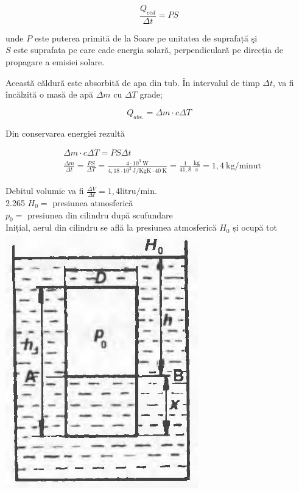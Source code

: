 \documentclass[10pt]{article}
\begin{document}
$$
\frac{Q_{c e d}}{\Delta t}=P S
$$

unde $P$ este puterea primită de la Soare pe unitatea de suprafață şi\\
$S$ este suprafata pe care cade energia solară, perpendiculară pe direcția de propagare a emisiei solare.

Această căldură este absorbită de apa din tub. În intervalul de timp $\Delta t$, va fi încălzită o masă de apă $\Delta m$ cu $\Delta T$ grade;

$$
Q_{a b s .}=\Delta m \cdot c \Delta T
$$

Din conservarea energiei rezultă

$$
\begin{aligned}
& \Delta m \cdot c \Delta T=P S \Delta t \\
& \frac{\Delta m}{\Delta t}=\frac{P S}{\Delta T}=\frac{4 \cdot 10^{3} \mathrm{~W}}{4,18 \cdot 10^{3} \mathrm{~J} / \mathrm{KgK} \cdot 40 \mathrm{~K}}=\frac{1}{41,8} \frac{\mathrm{~kg}}{\mathrm{~s}}=1,4 \mathrm{~kg} / \mathrm{minut}
\end{aligned}
$$

Debitul volumic va fi $\frac{\Delta V}{\Delta t}=1,4 \mathrm{litru} / \mathrm{min}$.\\
2.265 $H_{0}=$ presiunea atmosferică\\
$p_{0}=$ presiunea din cilindru după scufundare\\
Inițial, aerul din cilindru se află la presiunea atmosferică $H_{0}$ și ocupă tot\\
\includegraphics[max width=\textwidth, center]{2025_07_01_5b3ff9fa0d508c8e9f17g-328}
\end{document}
